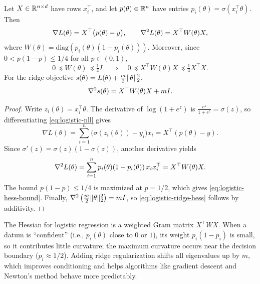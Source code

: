 \begin{lemma}
\label{lem:logistic-grad-hess}
Let $X \in \mathbb{R}^{n \times d}$ have rows $x_i^\top$, and let $p(\theta) \in \mathbb{R}^n$ have entries $p_i(\theta)=\sigma(x_i^\top\theta)$.
Then
\begin{equation}
  \nabla L(\theta) = X^\top \bigl(p(\theta) - y\bigr),
  \qquad
  \nabla^2 L(\theta) = X^\top W(\theta) X,
  \label{eq:logistic-grad-hess}
\end{equation}
where $W(\theta) = \mathrm{diag}(p_i(\theta)(1-p_i(\theta)))$.
Moreover, since $0 < p(1-p) \le 1/4$ for all $p \in (0,1)$,
\begin{equation}
  0 \preceq W(\theta) \preceq \tfrac14 I
  \quad\Rightarrow\quad
  0 \preceq X^\top W(\theta) X \preceq \tfrac14 X^\top X.
  \label{eq:logistic-hess-bound}
\end{equation}
For the ridge objective $s(\theta)=L(\theta)+\tfrac{m}{2}\lVert\theta\rVert_2^2$,
\begin{equation}
  \nabla^2 s(\theta) = X^\top W(\theta) X + m I.
  \label{eq:logistic-ridge-hess}
\end{equation}
\end{lemma}
\begin{proof}
Write $z_i(\theta)=x_i^\top\theta$.
The derivative of $\log(1+e^{z})$ is $\frac{e^z}{1+e^z}=\sigma(z)$, so differentiating \eqref{eq:logistic-nll} gives
\[
\nabla L(\theta)
= \sum_{i=1}^n \bigl(\sigma(z_i(\theta)) - y_i\bigr)x_i
= X^\top(p(\theta)-y).
\]
Since $\sigma'(z)=\sigma(z)(1-\sigma(z))$, another derivative yields
\[
\nabla^2 L(\theta)=\sum_{i=1}^n p_i(\theta)(1-p_i(\theta))\,x_i x_i^\top = X^\top W(\theta)X.
\]
The bound $p(1-p)\le 1/4$ is maximized at $p=1/2$, which gives \eqref{eq:logistic-hess-bound}.
Finally, $\nabla^2\left(\tfrac{m}{2}\lVert\theta\rVert_2^2\right)=mI$, so \eqref{eq:logistic-ridge-hess} follows by additivity.
\end{proof}

The Hessian for logistic regression is a weighted Gram matrix $X^\top W X$.
When a datum is ``confident'' (i.e., $p_i(\theta)$ close to $0$ or $1$), its weight $p_i(1-p_i)$ is small, so it contributes little curvature; the maximum curvature occurs near the decision boundary ($p_i \approx 1/2$).
Adding ridge regularization shifts all eigenvalues up by $m$, which improves conditioning and helps algorithms like gradient descent and Newton's method behave more predictably.
